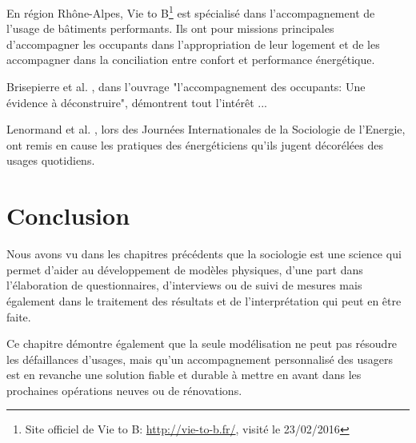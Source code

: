 En région Rhône-Alpes, Vie to B\footnote{Site officiel de Vie to B: \url{http://vie-to-b.fr/}, visité le 23/02/2016} est spécialisé dans l'accompagnement de l'usage de bâtiments performants. Ils ont pour missions principales d'accompagner les occupants dans l'appropriation de leur logement et de les accompagner dans la conciliation entre confort et performance énergétique.

Brisepierre et al. \cite{Brisepierre-15}, dans l'ouvrage "l'accompagnement des occupants: Une évidence à déconstruire", démontrent tout l'intérêt  ...

Lenormand et al. \cite{Lenormand-15}, lors des Journées Internationales de la Sociologie de l'Energie, ont remis en cause les pratiques des énergéticiens qu'ils jugent décorélées des usages quotidiens.


\section{Conclusion}

Nous avons vu dans les chapitres précédents que la sociologie est une science qui permet d'aider au développement de modèles physiques, d'une part dans l'élaboration de questionnaires, d'interviews ou de suivi de mesures mais également dans le traitement des résultats et de l'interprétation qui peut en être faite.

Ce chapitre démontre également que la seule modélisation ne peut pas résoudre les défaillances d'usages, mais qu'un accompagnement personnalisé des usagers est en revanche une solution fiable et durable à mettre en avant dans les prochaines opérations neuves ou de rénovations.